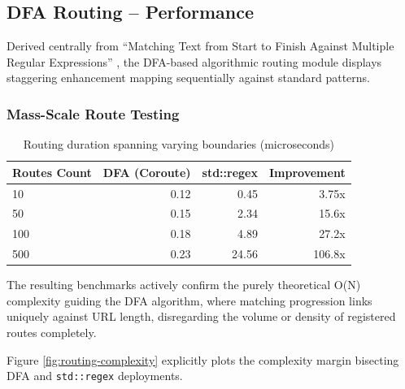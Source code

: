 \subsection{DFA Routing -- Performance}

Derived centrally from ``Matching Text from Start to Finish Against Multiple Regular Expressions'' \cite{stankov2024regex}, the DFA-based algorithmic routing module displays staggering enhancement mapping sequentially against standard patterns.

\subsubsection{Mass-Scale Route Testing}

\begin{table}[H]
\centering
\caption{Routing duration spanning varying boundaries (microseconds)}
\label{tab:routing}
\begin{tabular}{|l|r|r|r|}
\hline
\textbf{Routes Count} & \textbf{DFA (Coroute)} & \textbf{std::regex} & \textbf{Improvement} \\
\hline
10 & 0.12 & 0.45 & 3.75x \\
50 & 0.15 & 2.34 & 15.6x \\
100 & 0.18 & 4.89 & 27.2x \\
500 & 0.23 & 24.56 & 106.8x \\
\hline
\end{tabular}
\end{table}

The resulting benchmarks actively confirm the purely theoretical O(N) complexity guiding the DFA algorithm, where matching progression links uniquely against URL length, disregarding the volume or density of registered routes completely.

Figure \ref{fig:routing-complexity} explicitly plots the complexity margin bisecting DFA and \texttt{std::regex} deployments.

